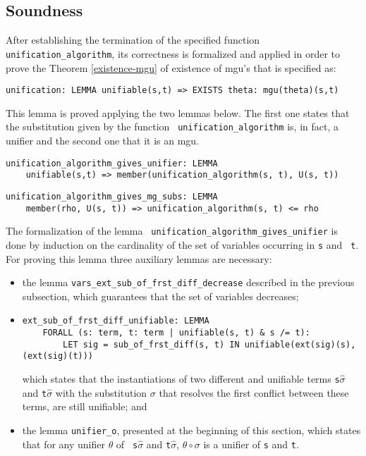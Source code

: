\documentclass[submission,copyright,creativecommons]{eptcs}
\begin{document}
\subsection{Soundness}
After establishing the termination of the specified function {\tt
  unification\_algorithm}, its correctness is formalized and applied
in order to prove the Theorem \ref{existence-mgu} of existence of
mgu's that is specified as:

{\small
\begin{verbatim}
unification: LEMMA unifiable(s,t) => EXISTS theta: mgu(theta)(s,t)
\end{verbatim}
}

This lemma is proved applying the two lemmas below.  The first one
states that the substitution given by the function {\tt
  unification\_algorithm} is, in fact, a unifier and the second one
that it is an mgu.

{\small
\begin{verbatim}
unification_algorithm_gives_unifier: LEMMA
    unifiable(s,t) => member(unification_algorithm(s, t), U(s, t))
\end{verbatim}
} {\small
\begin{verbatim}
unification_algorithm_gives_mg_subs: LEMMA
    member(rho, U(s, t)) => unification_algorithm(s, t) <= rho
\end{verbatim}
}

The formalization of the lemma {\tt
  unification\_algorithm\_gives\_unifier} is done by induction on the
cardinality of the set of variables occurring in {\tt s} and {\tt
  t}. For proving this lemma three auxiliary lemmas are necessary:

\begin{itemize}
\item the lemma {\tt vars\_ext\_sub\_of\_frst\_diff\_decrease}
  described in the previous subsection, which guarantees that the set
  of variables decreases;
\item {\small
\begin{verbatim}
ext_sub_of_frst_diff_unifiable: LEMMA
    FORALL (s: term, t: term | unifiable(s, t) & s /= t):
        LET sig = sub_of_frst_diff(s, t) IN unifiable(ext(sig)(s), (ext(sig)(t)))
\end{verbatim}
  } which states that the instantiations of two different and
  unifiable terms {\tt s}$\hat{\sigma}$ and {\tt t}$\hat{\sigma}$ with
  the substitution $\sigma$ that resolves the first conflict between
  these terms, are still unifiable; and

\item the lemma {\tt unifier\_o}, presented at the beginning of this
  section, which states that for any unifier $\theta$ of {\tt
    s}$\hat{\sigma}$ and {\tt t}$\hat{\sigma}$, $\theta\circ\sigma$ is
  a unifier of {\tt s} and {\tt t}.
\end{itemize}
\end{document}
